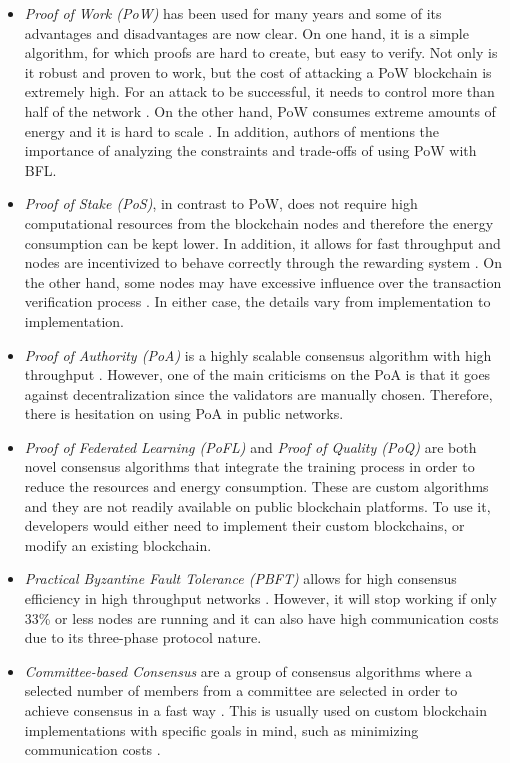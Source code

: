 \begin{itemize}
    \item \textit{Proof of Work (PoW)} has been used for many years and some of its advantages and disadvantages are now clear. On one hand, it is a simple algorithm, for which proofs are hard to create, but easy to verify. Not only is it robust and proven to work, but the cost of attacking a PoW blockchain is extremely high. For an attack to be successful, it needs to control more than half of the network \cite{li_blockchain_2021}. On the other hand, PoW consumes extreme amounts of energy and it is hard to scale \cite{edwood_2020, li_blockchain_2021, ccaf}. In addition, authors of  \cite{10.48550/arxiv.2112.07938} mentions the importance of analyzing the constraints and trade-offs of using PoW with BFL.

    \item \textit{Proof of Stake (PoS)}, in contrast to PoW, does not require high computational resources from the blockchain nodes and therefore the energy consumption can be kept lower. In addition, it allows for fast throughput and nodes are incentivized to behave correctly through the rewarding system \cite{li_blockchain_2021}. On the other hand, some nodes may have excessive influence over the transaction verification process \cite{li_blockchain_2021}. In either case, the details vary from implementation to implementation.
    
    \item \textit{Proof of Authority (PoA)} is a highly scalable consensus algorithm with high throughput \cite{binance_academy_2020}. However, one of the main criticisms on the PoA is that it goes against decentralization since the validators are manually chosen. Therefore, there is hesitation on using PoA in public networks.

    \item \textit{Proof of Federated Learning (PoFL)} \cite{9347812, 10.48550/arxiv.2007.15145} and \textit{Proof of Quality (PoQ)} \cite{8843900} are both novel consensus algorithms that integrate the training process in order to reduce the resources and energy consumption. These are custom algorithms and they are not readily available on public blockchain platforms. To use it, developers would either need to implement their custom blockchains, or modify an existing blockchain.

    \item \textit{Practical Byzantine Fault Tolerance (PBFT)} allows for high consensus efficiency in high throughput networks \cite{li_blockchain_2021}. However, it will stop working if only 33\% or less nodes are running and it can also have high communication costs due to its three-phase protocol nature.

    \item \textit{Committee-based Consensus} are a group of consensus algorithms where a selected number of members from a committee are selected in order to achieve consensus in a fast way \cite{qu_blockchain-enabled_2022}. This is usually used on custom blockchain implementations with specific goals in mind, such as minimizing communication costs \cite{9293091}.
\end{itemize}

